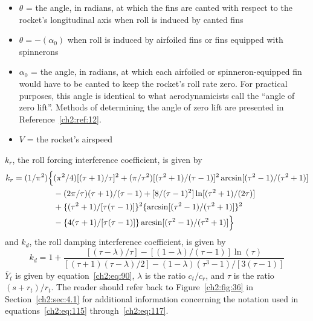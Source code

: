 \begin{itemize}[nosep,leftmargin=*,label={}]
  \item $\theta$ = the angle, in radians, at which the fins are canted with
  respect to the rocket's longitudinal axis when roll is induced by canted
  fins
  \item $\theta = -(\alpha_0)$ when roll is induced by airfoiled fins or fins
  equipped with spinnerons
  \item $\alpha_0$ = the angle, in radians, at which each airfoiled or
  spinneron-equipped fin would have to be canted to keep the rocket's roll
  rate zero. For practical purposes, this angle is identical to what
  aerodynamicists call the ``angle of zero lift''. Methods of determining the
  angle of zero lift are presented in Reference~\ref{ch2:ref:12}.
  \item $V$ = the rocket's airspeed
\end{itemize}
$k_r$, the roll forcing interference coefficient, is given by
\begin{equation}\label{ch2:eq:116}
\begin{split}
k_r = (1/\pi^{2})\Bigl\{&(\pi^{2}/4)[(\tau + 1)/\tau]^{2}
  + (\pi/\tau^{2})[(\tau^{2} + 1)/(\tau - 1)]^{2}\arcsin[(\tau^{2} - 1)/(\tau^{2} + 1)]\\
&- (2\pi/\tau)(\tau + 1)/(\tau - 1) + [8/(\tau - 1)^{2}]\ln[(\tau^{2} + 1)/(2\tau)]\\
&+ \{(\tau^{2} + 1)/[\tau(\tau - 1)]\}^{2}\{\arcsin[(\tau^{2} - 1)/(\tau^{2} + 1)]\}^{2}\\
&- \{4(\tau + 1)/[\tau(\tau - 1)]\}\arcsin[(\tau^{2} - 1)/(\tau^{2} + 1)]\Bigr\}
\end{split}
\end{equation}
and $k_d$, the roll damping interference coefficient, is given by
\begin{equation}\label{ch2:eq:117}
k_d = 1 + \frac{[(\tau - \lambda)/\tau] - [(1 - \lambda)/(\tau - 1)]\ln(\tau)}
  {[(\tau + 1)(\tau - \lambda)/2] - (1 - \lambda)(\tau^{3} - 1)/[3(\tau - 1)]}
\end{equation}
$\bar{Y}_t$ is given by equation~\eqref{ch2:eq:90}, $\lambda$ is the ratio
$c_t/c_r$, and $\tau$ is the ratio $(s + r_t)/r_t$. The reader should refer
back to Figure~\ref{ch2:fig:36} in Section~\ref{ch2:sec:4.1} for additional
information concerning the notation used in equations~\eqref{ch2:eq:115}
through~\eqref{ch2:eq:117}.

